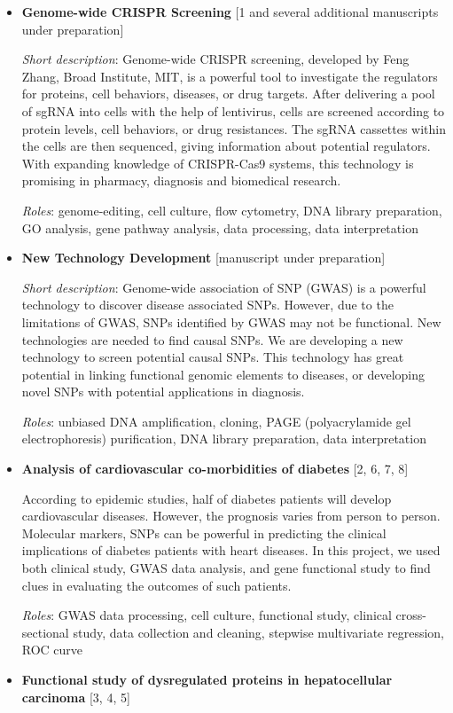 \documentclass[]{article}
\begin{document}
\begin{itemize}
\item
  \textbf{Genome-wide CRISPR Screening} {[}1 and several additional
  manuscripts under preparation{]}

  \emph{Short description}: Genome-wide CRISPR screening, developed by
  Feng Zhang, Broad Institute, MIT, is a powerful tool to investigate
  the regulators for proteins, cell behaviors, diseases, or drug
  targets. After delivering a pool of sgRNA into cells with the help of
  lentivirus, cells are screened according to protein levels, cell
  behaviors, or drug resistances. The sgRNA cassettes within the cells
  are then sequenced, giving information about potential regulators.
  With expanding knowledge of CRISPR-Cas9 systems, this technology is
  promising in pharmacy, diagnosis and biomedical research.

  \emph{Roles}: genome-editing, cell culture, flow cytometry, DNA
  library preparation, GO analysis, gene pathway analysis, data
  processing, data interpretation
\item
  \textbf{New Technology Development} {[}manuscript under preparation{]}

  \emph{Short description}: Genome-wide association of SNP (GWAS) is a
  powerful technology to discover disease associated SNPs. However, due
  to the limitations of GWAS, SNPs identified by GWAS may not be
  functional. New technologies are needed to find causal SNPs. We are
  developing a new technology to screen potential causal SNPs. This
  technology has great potential in linking functional genomic elements
  to diseases, or developing novel SNPs with potential applications in
  diagnosis.

  \emph{Roles}: unbiased DNA amplification, cloning, PAGE
  (polyacrylamide gel electrophoresis) purification, DNA library
  preparation, data interpretation
\item
  \textbf{Analysis of cardiovascular co-morbidities of diabetes} {[}2,
  6, 7, 8{]}

  According to epidemic studies, half of diabetes patients will develop
  cardiovascular diseases. However, the prognosis varies from person to
  person. Molecular markers, SNPs can be powerful in predicting the
  clinical implications of diabetes patients with heart diseases. In
  this project, we used both clinical study, GWAS data analysis, and
  gene functional study to find clues in evaluating the outcomes of such
  patients.

  \emph{Roles}: GWAS data processing, cell culture, functional study,
  clinical cross-sectional study, data collection and cleaning, stepwise
  multivariate regression, ROC curve
\item
  \textbf{Functional study of dysregulated proteins in hepatocellular
  carcinoma} {[}3, 4, 5{]}


\end{itemize}
\end{document}
